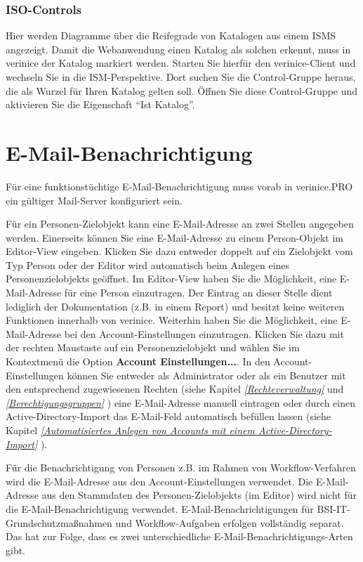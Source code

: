 \documentclass[a4paper,10pt]{book}
\begin{document}
\subsubsection{ISO-Controls}
\label{sec:iso-controls}

Hier werden Diagramme über die Reifegrade von Katalogen aus einem ISMS
angezeigt. Damit die Webanwendung einen Katalog als solchen erkennt,
muss in verinice der Katalog markiert werden. Starten Sie hierfür den
verinice-Client und wechseln Sie in die ISM-Perspektive. Dort suchen
Sie die Control-Gruppe heraus, die als Wurzel für Ihren Katalog gelten
soll. Öffnen Sie diese Control-Gruppe und aktivieren Sie die
Eigenschaft ``Ist Katalog''.


\section{E-Mail-Benachrichtigung} \label{E-Mail-Benachrichtigung}
Für eine funktionstüchtige E-Mail-Benachrichtigung muss vorab in verinice.PRO
ein gültiger Mail-Server konfiguriert sein.

Für ein Personen-Zielobjekt kann eine E-Mail-Adresse an zwei Stellen angegeben
werden. Einerseits können Sie eine E-Mail-Adresse zu einem Person-Objekt im
Editor-View eingeben. Klicken Sie dazu entweder doppelt auf ein Zielobjekt vom
Typ Person oder der Editor wird automatisch beim Anlegen eines
Personenzielobjekts geöffnet. Im Editor-View haben Sie die Möglichkeit, eine
E-Mail-Adresse für eine Person einzutragen. Der Eintrag an dieser Stelle dient
lediglich der Dokumentation (z.B. in einem Report) und besitzt keine weiteren
Funktionen innerhalb von verinice. Weiterhin haben Sie die Möglichkeit, eine
E-Mail-Adresse bei den Account-Einstellungen einzutragen. Klicken Sie dazu mit
der rechten Maustaste auf ein Personenzielobjekt und wählen Sie im Kontextmenü
die Option \textbf{Account Einstellungen...}. In den Account-Einstellungen
können Sie entweder als Administrator oder als ein Benutzer mit den entsprechend
zugewiesenen Rechten (siehe Kapitel {\em \ref{Rechteverwaltung}
} und {\em \ref{Berechtigungsgruppen}
}) eine E-Mail-Adresse manuell eintragen oder
durch einen Active-Directory-Import das E-Mail-Feld automatisch befüllen lassen
(siehe Kapitel {\em \ref{Automatisiertes Anlegen von Accounts mit einem
Active-Directory-Import} }).

Für die Benachrichtigung von Personen z.B. im Rahmen von Workflow-Verfahren wird die E-Mail-Adresse aus den Account-Einstellungen verwendet.
Die E-Mail-Adresse aus den Stammdaten des Personen-Zielobjekts (im Editor) wird nicht für die E-Mail-Benachrichtigung verwendet.
\newline
E-Mail-Benachrichtigungen für BSI-IT-Grundschutzmaßnahmen und Workflow-Aufgaben erfolgen vollständig separat. Das hat zur Folge, dass es zwei unterschiedliche
E-Mail-Benachrichtigungs-Arten gibt.
\newline
\end{document}
